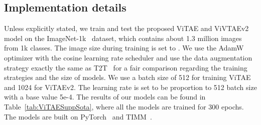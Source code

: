 \documentclass[twocolumn]{svjour3}          \smartqed  \usepackage{natbib}
\begin{document}
\subsection{Implementation details}
\label{subsec:impl}

Unless explicitly stated, we train and test the proposed ViTAE and ViVTAEv2 model on the ImageNet-1k~\citep{krizhevsky2012imagenet} dataset, which contains about 1.3 million images from 1k classes. The image size during training is set to . We use the AdamW~\citep{loshchilov2018decoupled} optimizer with the cosine learning rate scheduler and use the data augmentation strategy exactly the same as T2T~\citep{yuan2021tokens} for a fair comparison regarding the training strategies and the size of models. We use a batch size of 512 for training ViTAE and 1024 for ViTAEv2. The learning rate is set to be proportion to 512 batch size with a base value 5e-4. The results of our models can be found in Table~\ref{tab:ViTAESuppSota}, where all the models are trained for 300 epochs. The models are built on PyTorch~\citep{paszke2019pytorch} and TIMM~\citep{rw2019timm}.
\end{document}
